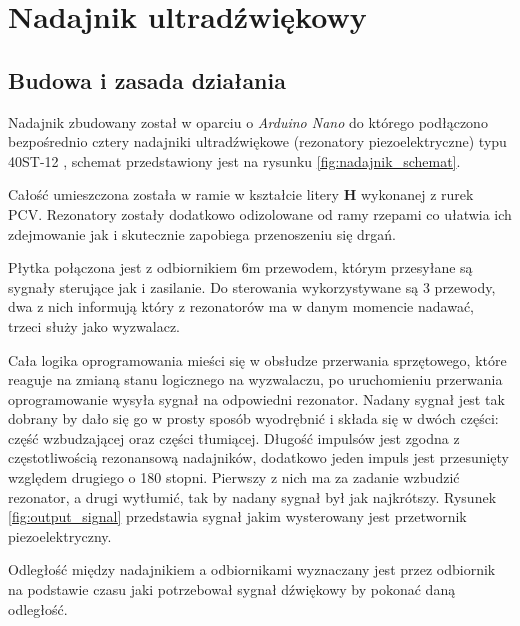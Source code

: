 \chapter{Nadajnik ultradźwiękowy}
\section{Budowa i zasada działania}

Nadajnik zbudowany został w oparciu o \textit{Arduino Nano} \cite{bib:arduinoNano} do którego podłączono 
bezpośrednio cztery nadajniki ultradźwiękowe (rezonatory piezoelektryczne) typu 40ST-12 \cite{bib:40ST12}, schemat 
przedstawiony jest na rysunku \ref{fig:nadajnik_schemat}.



Całość umieszczona została w ramie w kształcie litery \textbf{H} wykonanej z rurek PCV.
Rezonatory zostały dodatkowo odizolowane od ramy rzepami co ułatwia ich zdejmowanie jak i skutecznie
zapobiega przenoszeniu się drgań.



Płytka połączona jest z odbiornikiem 6m przewodem, którym przesyłane są sygnały sterujące jak i zasilanie.
Do sterowania wykorzystywane są 3 przewody, dwa z nich informują który z rezonatorów ma w danym momencie nadawać,
trzeci służy jako wyzwalacz.

Cała logika oprogramowania mieści się w obsłudze przerwania sprzętowego, które reaguje na zmianą stanu logicznego
na wyzwalaczu,
po uruchomieniu przerwania oprogramowanie wysyła sygnał na odpowiedni rezonator. 
Nadany sygnał jest tak dobrany by dało się go w prosty sposób wyodrębnić i składa się w dwóch
części: część wzbudzającej oraz części tłumiącej.
Długość impulsów jest zgodna z częstotliwością rezonansową nadajników, dodatkowo jeden
impuls jest przesunięty względem drugiego o 180 stopni. Pierwszy z nich ma za zadanie wzbudzić rezonator, a drugi wytłumić, 
tak by nadany sygnał był jak najkrótszy. 
Rysunek \ref{fig:output_signal} przedstawia sygnał jakim wysterowany jest przetwornik piezoelektryczny. 

Odległość między nadajnikiem a odbiornikami wyznaczany jest przez odbiornik na podstawie
czasu jaki potrzebował sygnał dźwiękowy by pokonać daną odległość.

